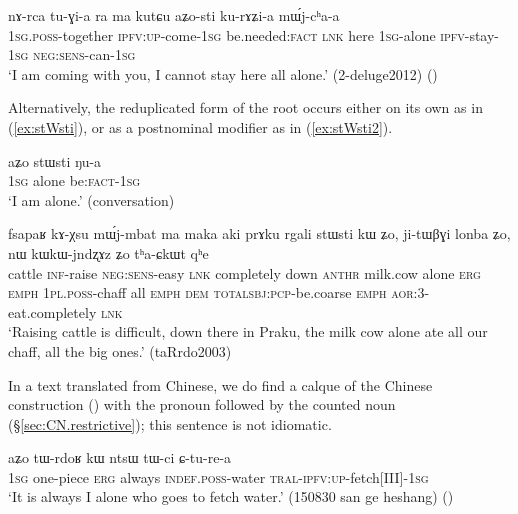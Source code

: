 \begin{exe}
	\ex \label{ex:aZosti}
	\gll   nɤ-rca tu-ɣi-a ra ma kutɕu aʑo-sti ku-rɤʑi-a mɯ́j-cʰa-a \\
	\textsc{1sg}.\textsc{poss}-together \textsc{ipfv}:\textsc{up}-come-\textsc{1sg} be.needed:\textsc{fact} \textsc{lnk} here \textsc{1sg}-alone \textsc{ipfv}-stay-\textsc{1sg} \textsc{neg}:\textsc{sens}-can-\textsc{1sg} \\
	\glt `I am coming with you, I cannot stay here all alone.' (2-deluge2012)
	()
\end{exe}

Alternatively, the reduplicated form of the root  occurs either on its own as in (\ref{ex:stWsti}), or as a postnominal modifier as in (\ref{ex:stWsti2}).

\begin{exe}
	\ex \label{ex:stWsti}
	\gll aʑo stɯsti ŋu-a \\
	\textsc{1sg} alone be:\textsc{fact}-\textsc{1sg} \\
	\glt `I am alone.' (conversation)
\end{exe}

\begin{exe}
	\ex \label{ex:stWsti2}
	\gll  fsapaʁ kɤ-χsu mɯ́j-mbat ma maka aki prɤku rgali stɯsti kɯ ʑo, ji-tɯβɣi lonba ʑo, nɯ kɯ\redp{}kɯ-jndʐɤz ʑo tʰa-ɕkɯt qʰe \\
	cattle \textsc{inf}-raise \textsc{neg}:\textsc{sens}-easy \textsc{lnk} completely down  \textsc{anthr} milk.cow alone \textsc{erg} \textsc{emph} \textsc{1pl}.\textsc{poss}-chaff all \textsc{emph} \textsc{dem} \textsc{total}\redp{}\textsc{sbj}:\textsc{pcp}-be.coarse \textsc{emph} \textsc{aor}:3\flobv{}-eat.completely \textsc{lnk} \\
	\glt `Raising cattle is difficult, down there in Praku, the milk cow alone ate all our chaff, all the big ones.' (taRrdo2003)
\end{exe}


In a text translated from Chinese, we do find a calque of the Chinese construction () with the pronoun  followed by the counted noun  (§\ref{sec:CN.restrictive}); this sentence is not idiomatic.

\begin{exe}
	\ex \label{ex:aZo.tWrdoR}
	\gll  aʑo tɯ-rdoʁ kɯ ntsɯ tɯ-ci ɕ-tu-re-a \\
	\textsc{1sg} one-piece \textsc{erg} always \textsc{indef}.\textsc{poss}-water \textsc{tral}-\textsc{ipfv}:\textsc{up}-fetch[III]-\textsc{1sg} \\
	\glt `It is always I alone who goes to fetch water.' (150830 san ge heshang)
()
\end{exe}

